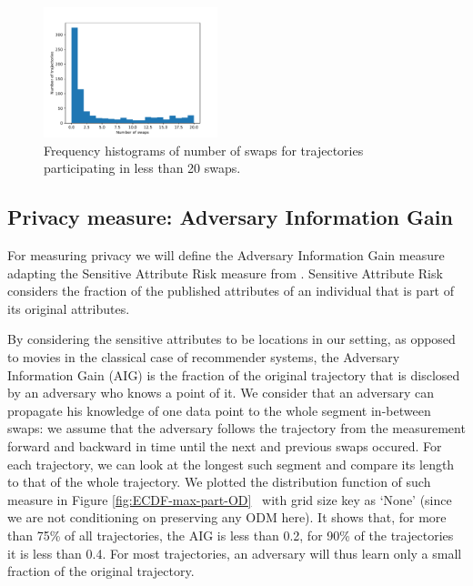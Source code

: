 \documentclass[times,twocolumn,final,authoryear]{elsarticle}
\begin{document}
\begin{figure}
    \includegraphics[width=0.45\textwidth]{figures/swaps-distribution-20.pdf}
  \caption{Frequency histograms of number of swaps for trajectories participating in less than 20 swaps.}
  \label{fig:swaps-distribution}%
\end{figure}

\subsection{Privacy measure: Adversary Information Gain}\label{Sec:InfoGain}
 
For measuring privacy we will define the Adversary Information Gain measure adapting the Sensitive Attribute Risk measure from \cite{Salas:2019}. Sensitive Attribute Risk considers the fraction of the published attributes of an individual that is part of its original attributes. 

By considering the sensitive attributes to be locations in our setting, as opposed to movies in the classical case of recommender systems, the Adversary Information Gain (AIG) is the fraction of the original trajectory that is disclosed by an adversary who knows a point of it.
We consider that an adversary can propagate his knowledge of one data point to the whole segment in-between swaps: we assume that the adversary follows the trajectory from the measurement forward and backward in time until the next and previous swaps occured. 
For each trajectory, we can look at the longest such segment and compare its length to that of the
whole trajectory. 
We plotted the distribution function of such measure in Figure \ref{fig:ECDF-max-part-OD}  with grid size key as `None' (since we are not conditioning on preserving any ODM here). 
It shows that, for more than 75\% of all
trajectories, the AIG is less than 0.2, for 90\% of the trajectories it is less
than 0.4. For most trajectories, an adversary will thus learn only a
small fraction of the original trajectory.
\end{document}
